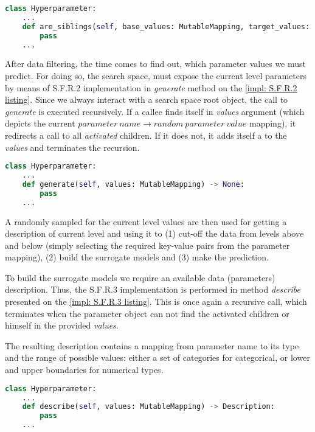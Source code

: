 \begin{lstlisting}[language=Python, caption=S.F.R.1 implementation., label=impl: S.F.R.1 listing]
class Hyperparameter:
	...
    def are_siblings(self, base_values: MutableMapping, target_values: MutableMapping) -> bool:
    	pass
	...
\end{lstlisting}

After data filtering, the time comes to find out, which parameter values we must predict. For doing so, the search space, must expose the current level parameters by means of S.F.R.2 implementation in \emph{generate} method on the \cref{impl: S.F.R.2 listing}. Since we always interact with a search space root object, the call to \emph{generate} is executed recursively. If a callee finds itself in \emph{values} argument (which depicts the current $parameter\ name \rightarrow random\ parameter\ value$ mapping), it redirects a call to all \textit{activated} children. If it does not, it adds itself a to the \emph{values} and terminates the recursion.

\begin{lstlisting}[language=Python, caption=S.F.R.2 implementation., label=impl: S.F.R.2 listing]
class Hyperparameter:
	...
    def generate(self, values: MutableMapping) -> None:
    	pass
	...
\end{lstlisting}

A randomly sampled for the current level values are then used for getting a description of current level and using it to (1) cut-off the data from levels above and below (simply selecting the required key-value pairs from the parameter mapping), (2) build the surrogate models and (3) make the prediction.

To build the surrogate models we require an available data (parameters) description. Thus, the S.F.R.3 implementation is performed in method \emph{describe} presented on the \cref{impl: S.F.R.3 listing}. This is once again a recursive call, which terminates when the parameter object can not find the activated children or himself in the provided \emph{values}.

The resulting description contains a mapping from parameter name to its type and the range of possible values: either a set of categories for categorical, or lower and upper boundaries for numerical types.

\begin{lstlisting}[language=Python, caption=S.F.R.3 implementation., label=impl: S.F.R.3 listing]
class Hyperparameter:
	...
    def describe(self, values: MutableMapping) -> Description:
    	pass
	...
\end{lstlisting}

